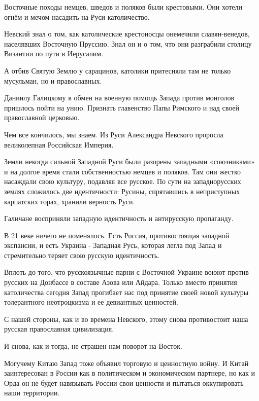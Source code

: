 Восточные походы немцев, шведов и поляков были крестовыми. Они хотели огнём и мечом насадить на Руси католичество.  

Невский знал о том, как католические крестоносцы онемечили славян-венедов,
населявших Восточную Пруссию. Знал он и о том, что они разграбили столицу
Византии по пути в Иерусалим. 

А отбив Святую Землю у сарацинов, католики притесняли там не только мусульман, но и православных. 

Даниилу Галицкому в обмен на военную помощь Запада против монголов пришлось
пойти на унию. Признать главенство Папы Римского и над своей православной
церковью. 

Чем все кончилось, мы знаем. 
Из Руси Александра Невского проросла великолепная Российская Империя. 

Земли некогда сильной Западной Руси были разорены западными «союзниками» и на
долгое время стали собственностью немцев и поляков.  Там они жестко насаждали
свою культуру, подавляя все русское. По сути на западнорусских землях сложилось
две идентичности: Русины, спрятавшись в неприступных карпатских горах, хранили
верность Руси. 

Галичане восприняли западную идентичность и антирусскую пропаганду.  

В 21 веке ничего не поменялось. Есть Россия, противостоящая западной экспансии,
и есть Украина - Западная Русь, которая легла под Запад и стремительно теряет
свою русскую идентичность. 

Вплоть до того, что русскоязычные парни с Восточной Украине воюют против
русских на Донбассе в составе Азова или Айдара. Только вместо принятия
католичества сегодня Запад прогибает нас под принятие своей новой культуры
толерантного неотроцкизма и ее девиантных ценностей. 

С нашей стороны, как и во времена Невского, этому снова противостоит наша
русская православная цивилизация. 

И снова, как и тогда, не страшен нам поворот на Восток. 

Могучему Китаю Запад тоже объявил торговую и ценностную войну. И Китай
заинтересован в России как в политическом и экономическом партнере, но как и
Орда он не будет навязывать России свои ценности и пытаться оккупировать наши
территории.
